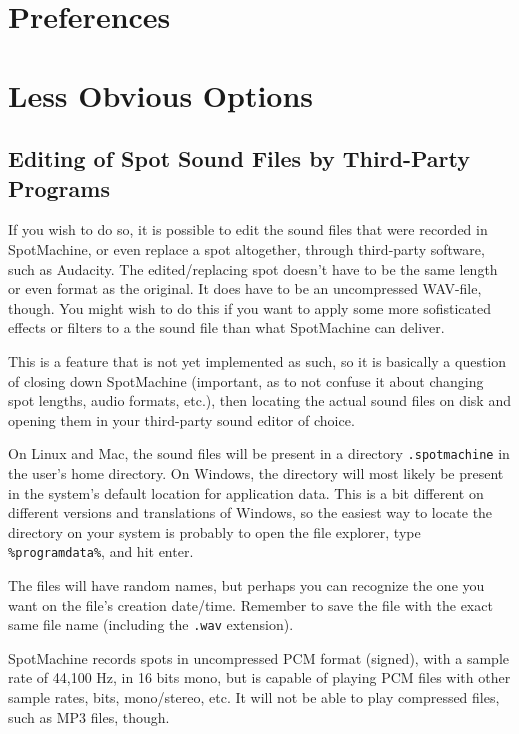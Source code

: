 \documentclass[a4paper,12pt]{report}
\begin{document}
\section{Preferences}


\section{Less Obvious Options}

\subsection{Editing of Spot Sound Files by Third-Party Programs}

If you wish to do so, it is possible to edit the sound files that were recorded
in SpotMachine, or even replace a spot altogether, through third-party software,
such as Audacity. The edited/replacing spot doesn't have to be the same length
or even format as the original. It does have to be an uncompressed WAV-file,
though. You might wish to do this if you want to apply some more sofisticated
effects or filters to a the sound file than what SpotMachine can deliver.

This is a feature that is not yet implemented as such, so it is basically a
question of closing down SpotMachine (important, as to not confuse it about
changing spot lengths, audio formats, etc.), then locating the actual sound
files on disk and opening them in your third-party sound editor of choice.

On Linux and Mac, the sound files will be present in a directory
\texttt{.spotmachine} in the user's home directory. On Windows, the directory
will most likely be present in the system's default location for application
data. This is a bit different on different versions and translations of Windows,
so the easiest way to locate the directory on your system is probably to open
the file explorer, type \texttt{\%programdata\%}, and hit enter.

The files will have random names, but perhaps you can recognize the one you
want on the file's creation date/time. Remember to save the file with the exact
same file name (including the \texttt{.wav} extension).

SpotMachine records spots in uncompressed PCM format (signed), with a sample
rate of 44,100 Hz, in 16 bits mono, but is capable of playing PCM files with
other sample rates, bits, mono/stereo, etc. It will not be able to play
compressed files, such as MP3 files, though.
\end{document}
